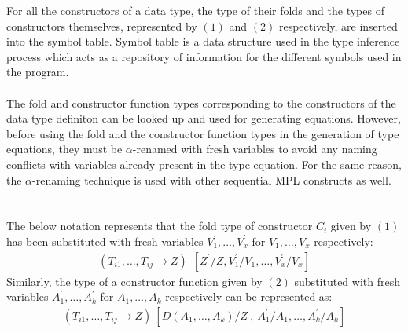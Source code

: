 \documentclass[11pt]{article}
\begin{document}
For all the constructors of a data type, the type of their folds and the types of constructors themselves, represented by $(1)$ and $(2)$ respectively, are inserted into the symbol table. Symbol table is a data structure used in the type inference process which acts as a repository of information for the different symbols used in the program. 
~~\\~~\\
The fold and constructor function types corresponding to the constructors of the data type definiton can be looked up and used for generating equations. However, before using the fold and the constructor function types in the generation of type equations, they must be $\alpha$-renamed with fresh variables to avoid any naming conflicts with variables already present in the type equation. For the same reason, the $\alpha$-renaming technique is used with other sequential MPL constructs as well.
~~\\~~\\ 
The below notation represents that the fold type of constructor $C_i$ given by $(1)$ has been substituted with fresh variables $V_1^\prime,\ldots,V_x^\prime$ for $V_1,\ldots,V_x$ respectively:
\begin{align*}
(T_{i1},\ldots,T_{ij}\to Z)~~[Z^\prime/Z,V_1^{\prime}/V_1,\ldots,V_x^{\prime}/V_x]
\end{align*}
Similarly, the type of a constructor function given by $(2)$ substituted with fresh variables $A_1^\prime,\ldots,A_k^\prime$ for $A_1,\ldots,A_k$ respectively can be represented as:
\begin{align*}
(T_{i1},\ldots,T_{ij}\to Z)~[D(A_1,\ldots,A_k)/Z~,~A_1^{\prime}/A_1,\ldots,A_k^{\prime}/A_k]
\end{align*}
\end{document}
